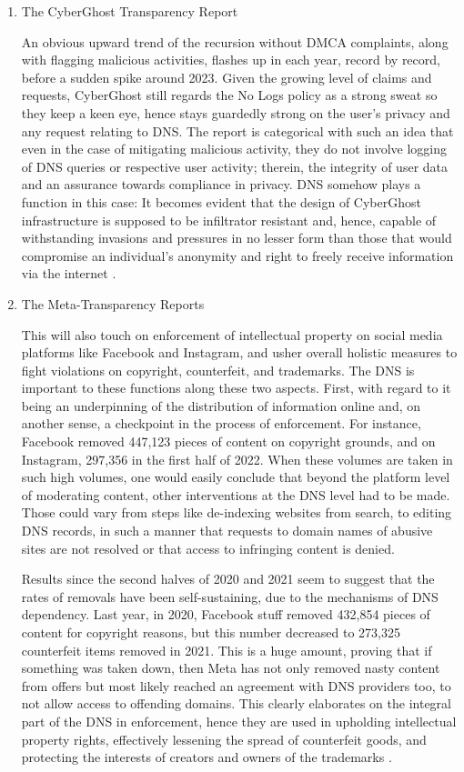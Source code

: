 \begin{enumerate}
\item The CyberGhost Transparency Report

An obvious upward trend of the recursion without DMCA complaints, along with flagging malicious activities, flashes up in each year, record by record, before a sudden spike around 2023. Given the growing level of claims and requests, CyberGhost still regards the No Logs policy as a strong sweat so they keep a keen eye, hence stays guardedly strong on the user's privacy and any request relating to DNS. The report is categorical with such an idea that even in the case of mitigating malicious activity, they do not involve logging of DNS queries or respective user activity; therein, the integrity of user data and an assurance towards compliance in privacy. DNS somehow plays a function in this case: It becomes evident that the design of CyberGhost infrastructure is supposed to be infiltrator resistant and, hence, capable of withstanding invasions and pressures in no lesser form than those that would compromise an individual's anonymity and right to freely receive information via the internet \cite{CyberGhostVPN2023}.

\item The Meta-Transparency Reports

This will also touch on enforcement of intellectual property on social media platforms like Facebook and Instagram, and usher overall holistic measures to fight violations on copyright, counterfeit, and trademarks. The DNS is important to these functions along these two aspects. First, with regard to it being an underpinning of the distribution of information online and, on another sense, a checkpoint in the process of enforcement. For instance, Facebook removed 447,123 pieces of content on copyright grounds, and on Instagram, 297,356 in the first half of 2022. When these volumes are taken in such high volumes, one would easily conclude that beyond the platform level of moderating content, other interventions at the DNS level had to be made. Those could vary from steps like de-indexing websites from search, to editing DNS records, in such a manner that requests to domain names of abusive sites are not resolved or that access to infringing content is denied.

Results since the second halves of 2020 and 2021 seem to suggest that the rates of removals have been self-sustaining, due to the mechanisms of DNS dependency. Last year, in 2020, Facebook stuff removed 432,854 pieces of content for copyright reasons, but this number decreased to 273,325 counterfeit items removed in 2021. This is a huge amount, proving that if something was taken down, then Meta has not only removed nasty content from offers but most likely reached an agreement with DNS providers too, to not allow access to offending domains. This clearly elaborates on the integral part of the DNS in enforcement, hence they are used in upholding intellectual property rights, effectively lessening the spread of counterfeit goods, and protecting the interests of creators and owners of the trademarks \cite{Facebook2023}.


\end{enumerate}
